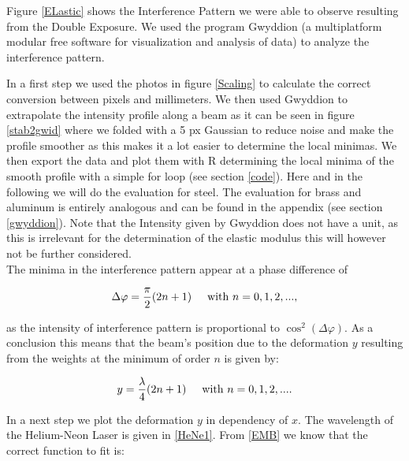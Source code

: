 Figure \ref{ELastic} shows the Interference Pattern we were able to observe resulting from the Double Exposure. We used the program Gwyddion (a multiplatform modular free software for visualization and analysis of data) to analyze the interference pattern.  


In a first step we used the photos in figure \ref{Scaling} to calculate the correct conversion between pixels and millimeters. We then used Gwyddion to extrapolate the intensity profile along a beam as it can be seen in figure \ref{stab2gwid} where we folded with a 5 px Gaussian to reduce noise and make the profile smoother as this makes it a lot easier to determine the local minimas. We then export the data and plot them with R determining the local minima of the smooth profile with a simple for loop (see section \ref{code}).  Here and in the following we will do the evaluation for steel. The evaluation for brass and aluminum is entirely analogous and can be found in the appendix (see section \ref{gwyddion}). Note that the Intensity given by Gwyddion does not have a unit, as this is irrelevant for the determination of the elastic modulus this will however not be further considered.\\

The minima in the interference pattern appear at a phase difference of

\begin{align*}
\Delta \varphi=\frac{\pi}{2}(2n+1)\hspace{0.5cm}\mbox{with }n=0,1,2,...,
\end{align*}

as the intensity of interference pattern is proportional to $\cos^2(\Delta\varphi)$. As a conclusion this means that the beam's position due to the deformation $y$ resulting from the weights at the minimum of order $n$ is given by:

\begin{align*}
y=\frac{\lambda}{4}(2n+1)\hspace{0.5cm}\mbox{with }n=0,1,2,... .
\end{align*}

In a next step we plot the deformation $y$ in dependency of $x$. The wavelength of the Helium-Neon Laser is given in \ref{HeNe1}. From \ref{EMB} we know that the correct function to fit is:

